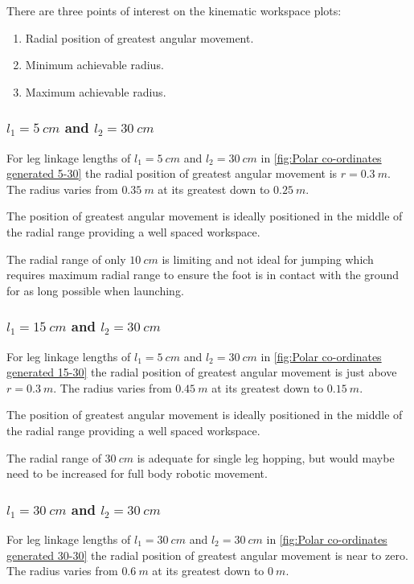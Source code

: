 There are three points of interest on the kinematic workspace plots:
\begin{enumerate}
\item Radial position of greatest angular movement.
\item Minimum achievable radius.
\item Maximum achievable radius.
\end{enumerate}

\subsubsection{$l_1=5\ cm$ and $l_2=30\ cm$}
For leg linkage lengths of $l_1=5\ cm$ and $l_2=30\ cm$ in \cref{fig:Polar co-ordinates generated 5-30} the radial position of greatest angular movement is $r=0.3\ m$. The radius varies from $0.35\ m$ at its greatest down to $0.25\ m$. 

The position of greatest angular movement is ideally positioned in the middle of the radial range providing a well spaced workspace. 

The radial range of only $10\ cm$ is limiting and not ideal for jumping which requires maximum radial range to ensure the foot is in contact with the ground for as long possible when launching.

\subsubsection{$l_1=15\ cm$ and $l_2=30\ cm$}
For leg linkage lengths of $l_1=5\ cm$ and $l_2=30\ cm$ in \cref{fig:Polar co-ordinates generated 15-30} the radial position of greatest angular movement is just above $r=0.3\ m$. The radius varies from $0.45\ m$ at its greatest down to $0.15\ m$. 

The position of greatest angular movement is ideally positioned in the middle of the radial range providing a well spaced workspace. 

The radial range of $30\ cm$ is adequate for single leg hopping, but would maybe need to be increased for full body robotic movement.

\subsubsection{$l_1=30\ cm$ and $l_2=30\ cm$}
For leg linkage lengths of $l_1=30\ cm$ and $l_2=30\ cm$ in \cref{fig:Polar co-ordinates generated 30-30} the radial position of greatest angular movement is near to zero. The radius varies from $0.6\ m$ at its greatest down to $0\ m$. 

